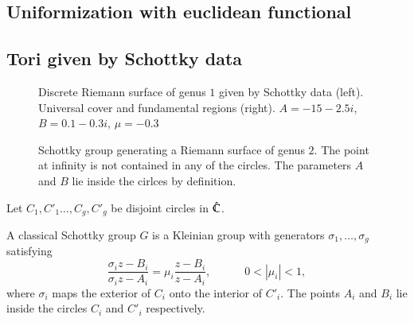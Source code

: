 \documentclass[Thesis]{subfiles}
\begin{document}
\subsection{Uniformization with euclidean functional}

\subsection{Tori given by Schottky data}

\begin{figure}
\centering
{}
\caption{Discrete Riemann surface of genus $1$ given by Schottky data (left). Universal cover and fundamental regions (right). $A=-15-2.5i$, $B=0.1-0.3i$, $\mu=-0.3$}
\label{fig:schottky_g1}
\end{figure}

\begin{figure} 
\centering 
\scalebox{1.0}{}
\caption{Schottky group generating a Riemann surface of genus $2$. The point
at infinity is not contained in any of the circles. The parameters $A$ and $B$
lie inside the cirlces by definition.} 
\label{fig:schottky_group}
\end{figure}

Let $C_1,C'_1\ldots,C_g,C'_g$ be disjoint circles in $\hat{\mathbb C}$.
\begin{definition} A classical Schottky group $G$ is a Kleinian group with generators $\sigma_1,\ldots,\sigma_g$ satisfying
\[
\frac{\sigma_i z - B_i}{\sigma_i z - A_i} = \mu_i \frac{z - B_i}{z - A_i},
\quad\quad\quad 0 < \left|\mu_i\right|<1,
\]
where $\sigma_i$ maps the exterior of $C_i$ onto the interior of $C'_i$. The points $A_i$ and $B_i$ lie inside the circles $C_i$ and $C'_i$ respectively.
\end{definition}
\end{document}
